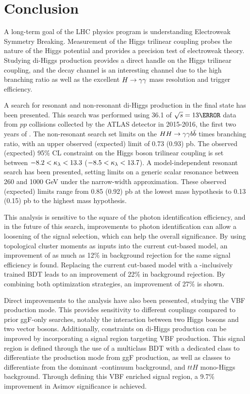 \chapter{Conclusion}

A long-term goal of the \gls{LHC} physics program is understanding Electroweak Symmetry Breaking. Measurement of the Higgs trilinear coupling probes the nature of the Higgs potential and provides a precision test of electroweak theory. Studying di-Higgs production provides a direct handle on the Higgs trilinear coupling, and the \yybb decay channel is an interesting channel due to the high \Hbb branching ratio as well as the excellent $H\rightarrow \gamma\gamma$ mass resolution and trigger efficiency.

A search for resonant and non-resonant di-Higgs production in the \yybb final state has been presented. This search was performed using 36.1 \ifb of $\sqs = \unit{13}{\TeV}$ data from $pp$ collisions collected by the ATLAS detector in 2015-2016, the first two years of \RunTwo. The non-resonant search set limits on the $HH\rightarrow\gamma\gamma b\bar{b}$ \xsec times branching ratio, with an upper observed (expected) limit of 0.73 (0.93) pb. The observed (expected) 95\% \gls{CL} constraint on the Higgs boson trilinear coupling is set between $-8.2 < \kappa_{\lambda} < 13.3$ ($-8.5 < \kappa_{\lambda} < 13.7$). A model-independent resonant search has been presented, setting limits on a generic scalar resonance between 260 and 1000 GeV under the narrow-width approximation. These observed (expected) limits range from 0.85 (0.92) pb at the lowest mass hypothesis to 0.13 (0.15) pb to the highest mass hypothesis.

This analysis is sensitive to the square of the photon identification efficiency, and in the future of this search, improvements to photon identification can allow a loosening of the signal selection, which can help the overall significance. By using topological cluster moments as inputs into the current cut-based model, an improvement of as much as 12\% in background rejection for the same signal efficiency is found. Replacing the current cut-based model with a \pt-inclusively trained \gls{BDT} leads to an improvement of 22\% in background rejection. By combining both optimization strategies, an improvement of 27\% is shown.


Direct improvements to the analysis have also been presented, studying the \gls{VBF} \hh production mode. This provides sensitivity to different couplings compared to prior \gls{ggF}-only searches, notably the interaction between two Higgs bosons and two vector bosons. Additionally, constraints on di-Higgs production can be improved by incorporating a signal region targeting \gls{VBF} production. This signal region is defined through the use of a multiclass \gls{BDT} with a dedicated class to differentiate the production mode from ggF \HH production, as well as classes to differentiate from the dominant \yy-continuum background, and $ttH$ mono-Higgs background. Through defining this \gls{VBF} enriched signal region, a 9.7\% improvement in Asimov significance is achieved.